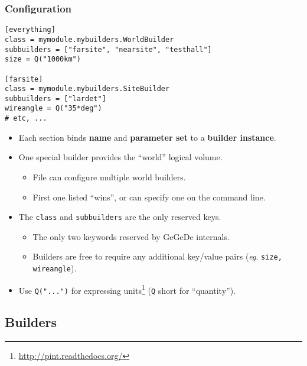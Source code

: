 \documentclass[10pt,xcolor=dvipsnames]{beamer}
\begin{document}
\begin{frame}[fragile]
  \frametitle{Configuration}
\small
\begin{verbatim}
[everything]  
class = mymodule.mybuilders.WorldBuilder
subbuilders = ["farsite", "nearsite", "testhall"]
size = Q("1000km")

[farsite]
class = mymodule.mybuilders.SiteBuilder
subbuilders = ["lardet"]
wireangle = Q("35*deg")
# etc, ...
\end{verbatim}

  \begin{itemize}\footnotesize
  \item Each section binds \textbf{name} and \textbf{parameter set} to a \textbf{builder instance}.
  \item One special builder provides the ``world'' logical volume.
    \begin{itemize}\scriptsize
    \item File can configure multiple world builders.
    \item First one listed ``wins'', or can specify one on the command line.
    \end{itemize}
  \item The \texttt{class} and \texttt{subbuilders} are the only reserved keys.
    \begin{itemize}\scriptsize
    \item The only two keywords reserved by GeGeDe internals.
    \item Builders are free to require any additional key/value pairs (\textit{eg}. \texttt{size, wireangle}).
    \end{itemize}
  \item Use \texttt{Q("...")} for expressing units\footnote{\url{http://pint.readthedocs.org/}} (\texttt{Q} short for ``quantity'').
  \end{itemize}

\end{frame}

\subsection{Builders}
\end{document}
